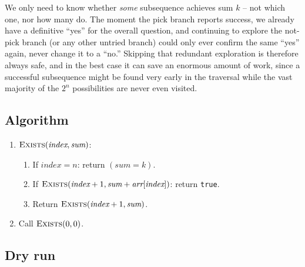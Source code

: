 We only need to know whether \emph{some} subsequence achieves sum $k$ --
not which one, nor how many do. The moment the pick branch reports
success, we already have a definitive ``yes'' for the overall question,
and continuing to explore the not-pick branch (or any other untried
branch) could only ever confirm the same ``yes'' again, never change it
to a ``no.'' Skipping that redundant exploration is therefore always
safe, and in the best case it can save an enormous amount of work,
since a successful subsequence might be found very early in the
traversal while the vast majority of the $2^n$ possibilities are never
even visited.

\subsection*{Algorithm}

\begin{enumerate}
  \item $\textsc{Exists}(\textit{index}, \textit{sum})$:
  \begin{enumerate}
    \item If $\textit{index} = n$: return $(\textit{sum} = k)$.
    \item If $\textsc{Exists}(\textit{index}+1, \textit{sum} +
          \textit{arr}[\textit{index}])$: return \texttt{true}.
    \item Return $\textsc{Exists}(\textit{index}+1, \textit{sum})$.
  \end{enumerate}
  \item Call $\textsc{Exists}(0, 0)$.
\end{enumerate}

\subsection*{Dry run}


